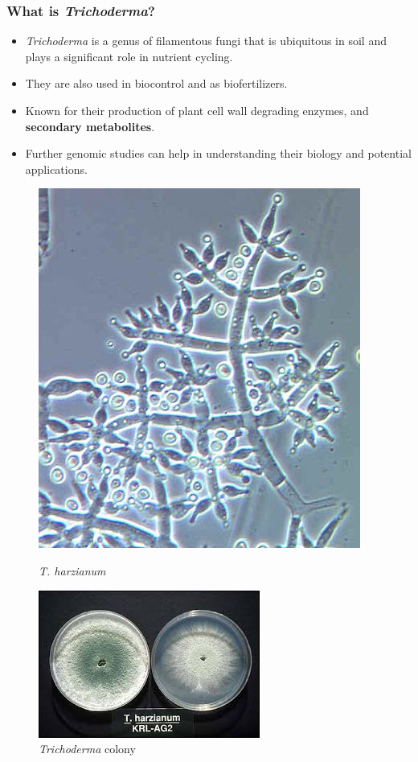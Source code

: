\documentclass[t]{beamer}
\begin{document}
\begin{frame}
	\frametitle{What is \textit{Trichoderma}?}
	\begin{itemize}
		\item \textit{Trichoderma} is a genus of filamentous fungi that is ubiquitous in soil and plays a significant role in nutrient cycling.
		\item They are also used in biocontrol and as biofertilizers.
		\item Known for their production of plant cell wall degrading enzymes, and \textbf{secondary metabolites}.
		\item Further genomic studies can help in understanding their biology and potential applications.
	\end{itemize}
	\vspace{0.05cm}
	\centering

	\begin{figure}
		\centering
		\begin{minipage}{0.5\textwidth}
			\centering
			\includegraphics[width=0.35\linewidth]{./Trichoderma_harzianum.jpg}
			\caption{\textit{T. harzianum}}
		\end{minipage}\hfill
		\begin{minipage}{0.48\textwidth}
			\centering
			\includegraphics[width=0.6\linewidth]{./Trichoderma_petri.jpg}
			\caption{\textit{Trichoderma} colony}
		\end{minipage}
	\end{figure}
\end{frame}
\end{document}
